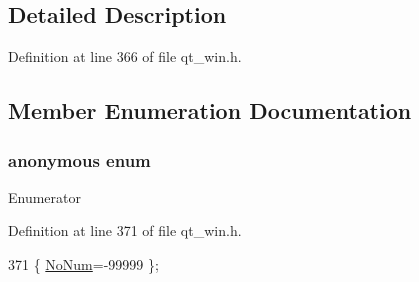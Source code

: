 \subsection{Detailed Description}


Definition at line 366 of file qt\+\_\+win.\+h.



\subsection{Member Enumeration Documentation}
\hypertarget{classNetHackQtLabelledIcon_a1712089bb1061d18f71a3e781772027c}{\subsubsection[{anonymous enum}]{\setlength{\rightskip}{0pt plus 5cm}anonymous enum}}\label{classNetHackQtLabelledIcon_a1712089bb1061d18f71a3e781772027c}
\begin{Desc}
\item[Enumerator]\par
\begin{description}
\item[{\em 
\hypertarget{classNetHackQtLabelledIcon_a1712089bb1061d18f71a3e781772027cae97b25166159ca49a60ef920bdfe57cb}{No\+Num}\label{classNetHackQtLabelledIcon_a1712089bb1061d18f71a3e781772027cae97b25166159ca49a60ef920bdfe57cb}
}]\end{description}
\end{Desc}


Definition at line 371 of file qt\+\_\+win.\+h.


\begin{DoxyCode}
371 \{ \hyperlink{classNetHackQtLabelledIcon_a1712089bb1061d18f71a3e781772027cae97b25166159ca49a60ef920bdfe57cb}{NoNum}=-99999 \};
\end{DoxyCode}


